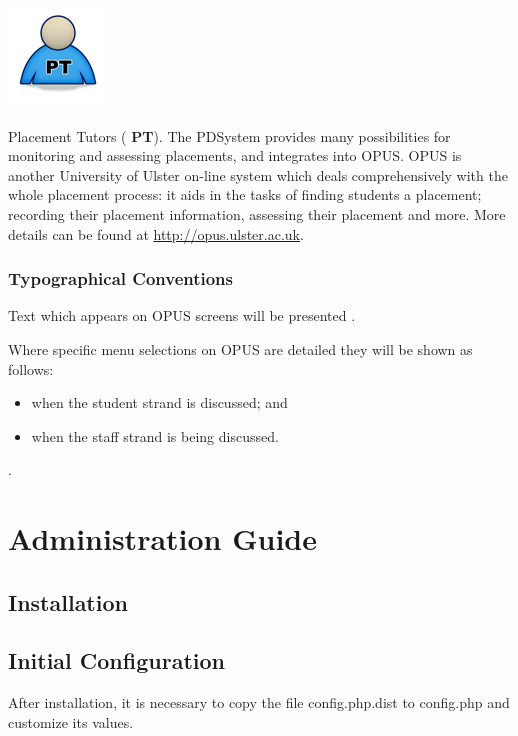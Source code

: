 \documentclass[12 pt]{book}
\begin{document}
\parbox{2 cm}{\includegraphics{png/icon_pt.png}}
\parbox{9 cm}{Placement Tutors ({\bfseries 
PT}). The PDSystem provides many possibilities for
monitoring and assessing placements, and integrates into
OPUS. OPUS is another University of Ulster on-line system
which deals comprehensively with the whole
placement process: it aids in the tasks of finding students
a placement; recording their placement information,
assessing their placement and more. More details can
be found at \url{http://opus.ulster.ac.uk}.}

\section{Typographical Conventions}

Text which appears on OPUS screens will be
presented .

Where specific menu selections on OPUS are detailed they will
be shown as follows: 
\begin{itemize}
\item {} when the student strand is discussed; and
\item {} when the staff strand is being discussed.
\end{itemize}

.

\part{Administration Guide}

\chapter{Installation}

\chapter{Initial Configuration}

After installation, it is necessary to copy the file config.php.dist to
config.php and customize its values.
\end{document}
